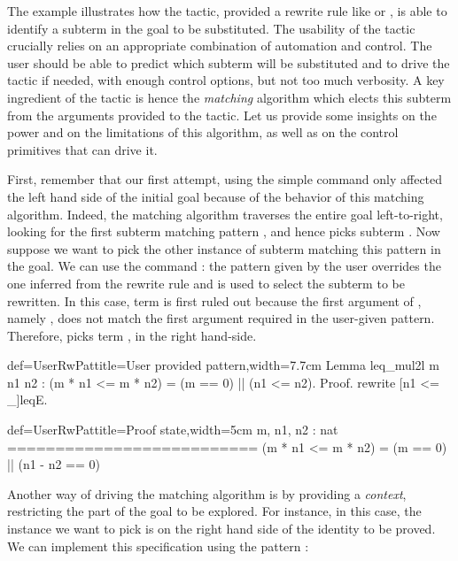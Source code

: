 The example  illustrates how the  tactic, provided a
rewrite rule like  or , is able
to identify a
subterm in the goal to be substituted. The usability of the
tactic crucially relies on an appropriate combination of automation
and control. The user should be able to predict which subterm will be
substituted and to drive the tactic if needed, with enough control
options, but not too much verbosity. A key ingredient of the
 tactic is hence the \emph{matching} algorithm which
elects this subterm from the arguments provided to the tactic. Let us
provide some insights on the power and on the limitations of this
algorithm, as well as on the control primitives that can drive it.

First, remember that our first attempt, using the simple
 command only
affected the left hand side of the initial goal because of the
behavior of this matching algorithm.
Indeed, the matching algorithm traverses the entire goal
left-to-right, looking for the first subterm matching pattern
\C{(_ <= _)},  and hence picks subterm .
Now suppose we want to pick
the other instance of subterm matching this pattern in the goal. We
can use the command : the
pattern given by the user overrides the one inferred from the rewrite
rule and is used to select the subterm to be rewritten. In this case,
term  is first ruled out because the first argument of
\C{<=}, namely , does not match the first argument 
required in the user-given pattern. Therefore,  picks term
, in the right hand-side.

\begin{coq}{def=UserRwPat}{title=User provided pattern,width=7.7cm}
Lemma leq_mul2l m n1 n2 :
(m * n1 <= m * n2) = (m == 0) || (n1 <= n2).
Proof.
rewrite [n1 <= _]leqE.
\end{coq}
\begin{coqout}{def=UserRwPat}{title=Proof state,width=5cm}
m, n1, n2 : nat
==========================
(m * n1 <= m * n2) =
(m == 0) || (n1 - n2 == 0)
\end{coqout}

Another way of driving the matching algorithm is by providing a
\emph{context}, restricting the part of the goal to be explored. For
instance, in this case, the instance we want to pick is on
the right hand side of the identity to be proved. We can implement
this specification using the pattern \C{[in RHS]}:

